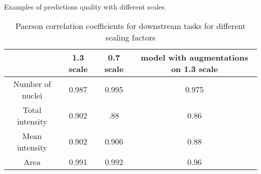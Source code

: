Examples of predictions quality with different scales.

\begin{table}[H]
    \centering
    \caption{Paerson correlation coefficients for downstream tasks for different scaling factors} 
        \begin{adjustbox}{width=0.4\textwidth}
            \begin{tabular}{|c|c|c|c|}\hline
                &1.3 scale&0.7 scale&model with augmentations on 1.3 scale
                \\\hline\hline
                Number of nuclei&0.987&0.995&0.975\\\hline
                Total intensity&0.902&.88&0.86\\\hline
                Mean intensity&0.902&0.906&0.88\\\hline
                Area&0.991&0.992&0.96\\\hline
            \end{tabular}
        \end{adjustbox}
\end{table}
